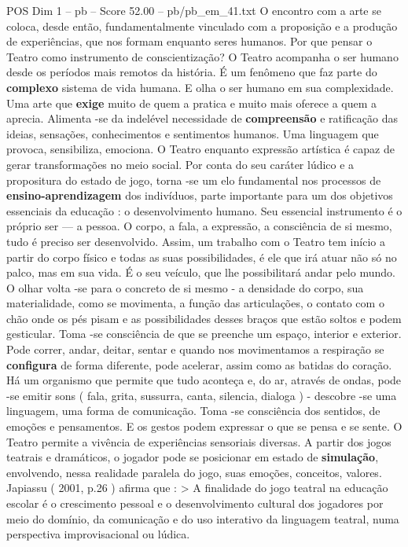 \begin{textsample}{POS Dim 1 – pb – Score 52.00 – pb/pb\_em\_41.txt}
O encontro com a arte se coloca, desde então, fundamentalmente vinculado com a proposição e a produção de experiências, que nos formam enquanto seres humanos.
Por que pensar o Teatro como instrumento de conscientização?
O Teatro acompanha o ser humano desde os períodos mais remotos da história.
É um fenômeno que faz parte do \textbf{complexo} sistema de vida humana.
E olha o ser humano em sua complexidade.
Uma arte que \textbf{exige} muito de quem a pratica e muito mais oferece a quem a aprecia.
Alimenta -se da indelével necessidade de \textbf{compreensão} e ratificação das ideias, sensações, conhecimentos e sentimentos humanos.
Uma linguagem que provoca, sensibiliza, emociona.
O Teatro enquanto expressão artística é capaz de gerar transformações no meio social.
Por conta do seu caráter lúdico e a propositura do estado de jogo, torna -se um elo fundamental nos processos de \textbf{ensino-aprendizagem} dos indivíduos, parte importante para um dos objetivos essenciais da educação : o desenvolvimento humano.
Seu essencial instrumento é o próprio ser — a pessoa.
O corpo, a fala, a expressão, a consciência de si mesmo, tudo é preciso ser desenvolvido.
Assim, um trabalho com o Teatro tem início a partir do corpo físico e todas as suas possibilidades, é ele que irá atuar não só no palco, mas em sua vida.
É o seu veículo, que lhe possibilitará andar pelo mundo.
O olhar volta -se para o concreto de si mesmo - a densidade do corpo, sua materialidade, como se movimenta, a função das articulações, o contato com o chão onde os pés pisam e as possibilidades desses braços que estão soltos e podem gesticular.
Toma -se consciência de que se preenche um espaço, interior e exterior.
Pode correr, andar, deitar, sentar e quando nos movimentamos a respiração se \textbf{configura} de forma diferente, pode acelerar, assim como as batidas do coração.
Há um organismo que permite que tudo aconteça e, do ar, através de ondas, pode -se emitir sons ( fala, grita, sussurra, canta, silencia, dialoga ) - descobre -se uma linguagem, uma forma de comunicação.
Toma -se consciência dos sentidos, de emoções e pensamentos.
E os gestos podem expressar o que se pensa e se sente.
O Teatro permite a vivência de experiências sensoriais diversas.
A partir dos jogos teatrais e dramáticos, o jogador pode se posicionar em estado de \textbf{simulação}, envolvendo, nessa realidade paralela do jogo, suas emoções, conceitos, valores.
Japiassu ( 2001, p.26 ) afirma que : > A finalidade do jogo teatral na educação escolar é o crescimento pessoal e o desenvolvimento cultural dos jogadores por meio do domínio, da comunicação e do uso interativo da linguagem teatral, numa perspectiva improvisacional ou lúdica.

\end{textsample}
